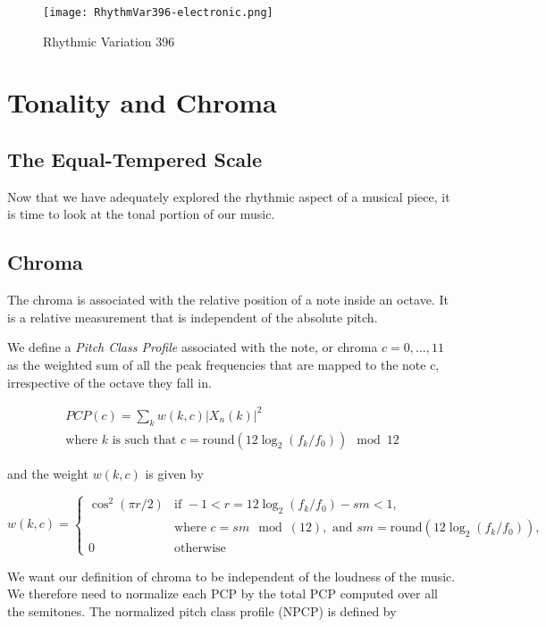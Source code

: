 \documentclass{article} %
\begin{document}
\begin{figure}[H]
\centering
\texttt{[image: RhythmVar396-electronic.png]}
\caption{Rhythmic Variation 396}
\label{fig:rhythmVar396}
\end{figure}

\section{Tonality and Chroma}
\subsection{The Equal-Tempered Scale}
Now that we have adequately explored the rhythmic aspect of a musical piece, it is time to look at the tonal portion of our music. 

\subsection{Chroma}
The chroma is associated with the relative position of a note inside an octave. It is a relative measurement that is independent of the absolute pitch. 

We define a \emph{Pitch Class Profile} associated with the note, or chroma $c=0,\dots,11$ as the weighted sum of all the peak frequencies that are mapped
to the note c, irrespective of the octave they fall in. 


\begin{equation}
\label{eq:PCP}
\begin{aligned}
PCP(c)=\sum \limits_k w(k,c) |X_n(k)|^2\\
\text{where } k \text{ is such that } c=\text{round}(12 \log_2(f_k/f_0)) \mod12
\end{aligned}
\end{equation}

and the weight $w(k,c)$ is given by

\begin{equation}
\label{eq:wkc}
w(k,c)=
\begin{cases}
\cos^2(\pi r/2) &\mbox{if } -1<r=12 \log_2(f_k/f_0)-sm<1,\\
&\mbox{where }c=sm \mod(12), \text{ and } sm=\text{round}(12 \log_2(f_k/f_0)),\\[2ex]
0& \mbox{otherwise}
\end{cases}
\end{equation}
 
We want our definition of chroma to be independent of the loudness of the music. We therefore need to normalize each PCP by the total PCP computed over all the semitones. 
The normalized pitch class profile (NPCP) is defined by
\end{document}
